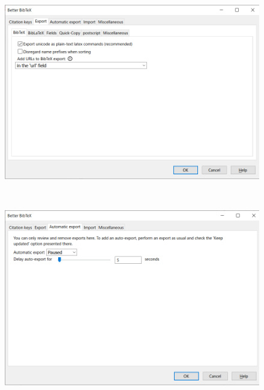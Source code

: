 \documentclass[a4paper,pdftex]{article}
\begin{document}
\begin{figure}[ht]
\begin{minipage}[ht]{0.19\columnwidth}
  \end{minipage}
  \begin{minipage}[ht]{0.19\columnwidth}
    \centering
    \includegraphics[width=\columnwidth]{fig/zotero10.png}
  \end{minipage}
  \\
  \begin{minipage}[ht]{0.19\columnwidth}
    \centering
    \includegraphics[width=\columnwidth]{fig/zotero11.png}
  \end{minipage}
  \begin{minipage}[ht]{0.19\columnwidth}
    \centering

\end{minipage}
\end{figure}
\end{document}

